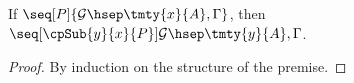 \begin{lemma}\label{lem:hcp-preservation-subst}
  If $\seq[P]{\mathcal{G} \hsep \tmty{x}{A}, \Gamma}$,
  then $\seq[\cpSub{y}{x}{P}]{\mathcal{G} \hsep \tmty{y}{A}, \Gamma}$.
\end{lemma}
\begin{proof}
  By induction on the structure of the premise.
\end{proof}
